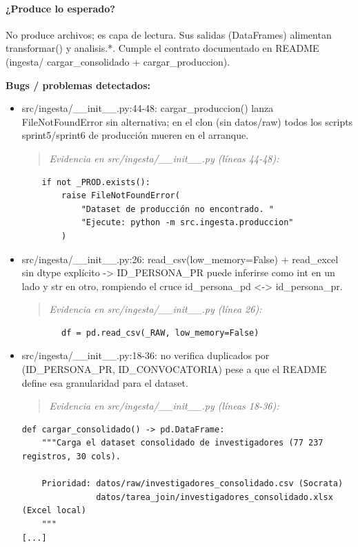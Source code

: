 \paragraph{¿Produce lo esperado?}
No produce archivos; es capa de lectura. Sus salidas (DataFrames) alimentan transformar() y analisis.*. Cumple el contrato documentado en README (ingesta/ cargar\_consolidado + cargar\_produccion).

\begin{tcolorbox}[riesgo]
\textbf{Bugs / problemas detectados:}
\begin{itemize}
  \item src/ingesta/\_\_init\_\_.py:44-48: cargar\_produccion() lanza FileNotFoundError sin alternativa; en el clon (sin datos/raw) todos los scripts sprint5/sprint6 de producción mueren en el arranque.
\begin{quote}\footnotesize\ttfamily
\noindent\emph{Evidencia en src/ingesta/\_\_init\_\_.py (líneas 44-48):}
\end{quote}
\begin{lstlisting}
    if not _PROD.exists():
        raise FileNotFoundError(
            "Dataset de producción no encontrado. "
            "Ejecute: python -m src.ingesta.produccion"
        )
\end{lstlisting}

  \item src/ingesta/\_\_init\_\_.py:26: read\_csv(low\_memory=False) + read\_excel sin dtype explícito -> ID\_PERSONA\_PR puede inferirse como int en un lado y str en otro, rompiendo el cruce id\_persona\_pd <-> id\_persona\_pr.
\begin{quote}\footnotesize\ttfamily
\noindent\emph{Evidencia en src/ingesta/\_\_init\_\_.py (línea 26):}
\end{quote}
\begin{lstlisting}
        df = pd.read_csv(_RAW, low_memory=False)
\end{lstlisting}

  \item src/ingesta/\_\_init\_\_.py:18-36: no verifica duplicados por (ID\_PERSONA\_PR, ID\_CONVOCATORIA) pese a que el README define esa granularidad para el dataset.
\begin{quote}\footnotesize\ttfamily
\noindent\emph{Evidencia en src/ingesta/\_\_init\_\_.py (líneas 18-36):}
\end{quote}
\begin{lstlisting}
def cargar_consolidado() -> pd.DataFrame:
    """Carga el dataset consolidado de investigadores (77 237 registros, 30 cols).

    Prioridad: datos/raw/investigadores_consolidado.csv (Socrata)
               datos/tarea_join/investigadores_consolidado.xlsx (Excel local)
    """
[...]
\end{lstlisting}

\end{itemize}
\end{tcolorbox}

